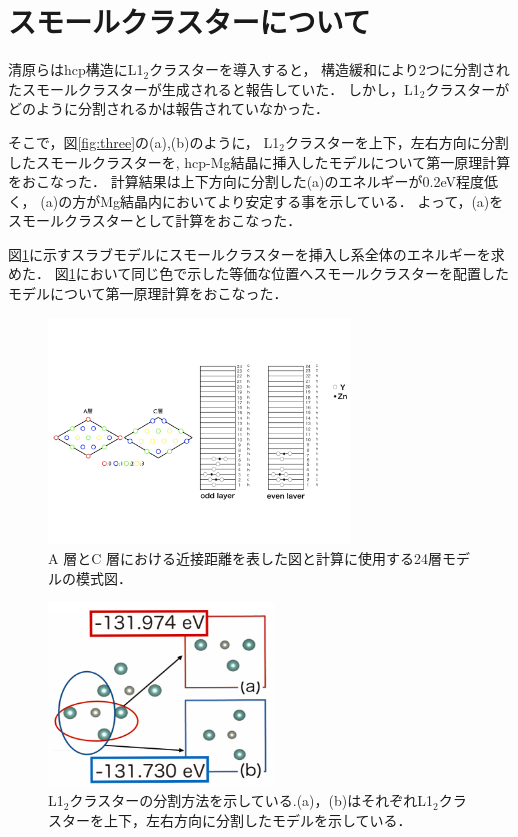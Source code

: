 \documentclass[a4j,twocolumn]{jsarticle}
\begin{document}
\section{スモールクラスターについて}
清原らはhcp構造にL1$_2$クラスターを導入すると，
構造緩和により2つに分割されたスモールクラスターが生成されると報告していた\cite{kiyohara}．
しかし，L1$_2$クラスターがどのように分割されるかは報告されていなかった．

そこで，図\ref{fig:three}の(a),(b)のように，
L1$_2$クラスターを上下，左右方向に分割したスモールクラスターを,
hcp-Mg結晶に挿入したモデルについて第一原理計算をおこなった．
計算結果は上下方向に分割した(a)のエネルギーが0.2eV程度低く，
(a)の方がMg結晶内においてより安定する事を示している．
よって，(a)をスモールクラスターとして計算をおこなった．

図\ref{fig:one}に示すスラブモデルにスモールクラスターを挿入し系全体のエネルギーを求めた．
図\ref{fig:one}において同じ色で示した等価な位置へスモールクラスターを配置したモデルについて第一原理計算をおこなった．

\begin{figure}[H]
\vspace{-1.3\baselineskip}
\begin{center}
   \includegraphics[width=80mm]{./slab24_color.jpeg}
   \vspace{-0.6\baselineskip}
  \caption{A 層とC 層における近接距離を表した図と計算に使用する24層モデルの模式図．}
  \label{fig:one}
\end{center}
\end{figure}

\begin{figure}[h]
\vspace{-2.0\baselineskip}
\begin{center}
   \includegraphics[width=60mm]{./dividing_cluster.png}
  \caption{L1$_2$クラスターの分割方法を示している.(a)，(b)はそれぞれL1$_2$クラスターを上下，左右方向に分割したモデルを示している．}
  \label{fig:two}
\end{center}
\end{figure}
\vspace{-2.0\baselineskip}
\end{document}
